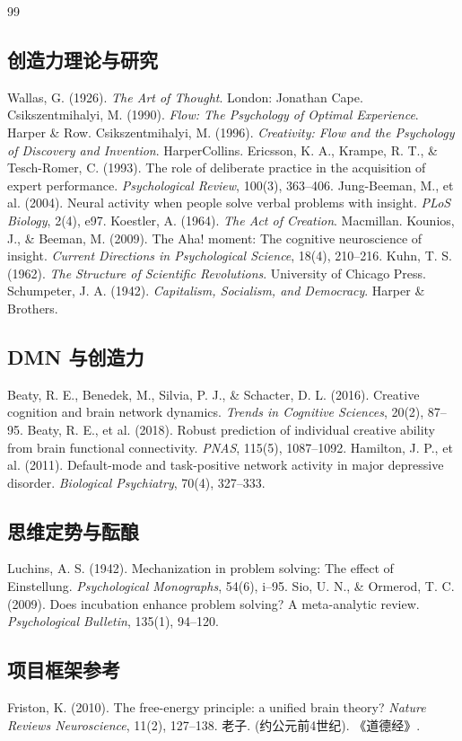 \documentclass[UTF8,12pt,a4paper]{ctexart}
\begin{document}
\begin{thebibliography}{99}

\subsection*{创造力理论与研究}
 Wallas, G. (1926). \textit{The Art of Thought}. London: Jonathan Cape.
 Csikszentmihalyi, M. (1990). \textit{Flow: The Psychology of Optimal Experience}. Harper \& Row.
 Csikszentmihalyi, M. (1996). \textit{Creativity: Flow and the Psychology of Discovery and Invention}. HarperCollins.
 Ericsson, K. A., Krampe, R. T., \& Tesch-Romer, C. (1993). The role of deliberate practice in the acquisition of expert performance. \textit{Psychological Review}, 100(3), 363--406.
 Jung-Beeman, M., et al. (2004). Neural activity when people solve verbal problems with insight. \textit{PLoS Biology}, 2(4), e97.
 Koestler, A. (1964). \textit{The Act of Creation}. Macmillan.
 Kounios, J., \& Beeman, M. (2009). The Aha! moment: The cognitive neuroscience of insight. \textit{Current Directions in Psychological Science}, 18(4), 210--216.
 Kuhn, T. S. (1962). \textit{The Structure of Scientific Revolutions}. University of Chicago Press.
 Schumpeter, J. A. (1942). \textit{Capitalism, Socialism, and Democracy}. Harper \& Brothers.

\subsection*{DMN 与创造力}
 Beaty, R. E., Benedek, M., Silvia, P. J., \& Schacter, D. L. (2016). Creative cognition and brain network dynamics. \textit{Trends in Cognitive Sciences}, 20(2), 87--95.
 Beaty, R. E., et al. (2018). Robust prediction of individual creative ability from brain functional connectivity. \textit{PNAS}, 115(5), 1087--1092.
 Hamilton, J. P., et al. (2011). Default-mode and task-positive network activity in major depressive disorder. \textit{Biological Psychiatry}, 70(4), 327--333.

\subsection*{思维定势与酝酿}
 Luchins, A. S. (1942). Mechanization in problem solving: The effect of Einstellung. \textit{Psychological Monographs}, 54(6), i--95.
 Sio, U. N., \& Ormerod, T. C. (2009). Does incubation enhance problem solving? A meta-analytic review. \textit{Psychological Bulletin}, 135(1), 94--120.

\subsection*{项目框架参考}
 Friston, K. (2010). The free-energy principle: a unified brain theory? \textit{Nature Reviews Neuroscience}, 11(2), 127--138.
 老子. (约公元前4世纪). 《道德经》.

\end{thebibliography}
\end{document}
